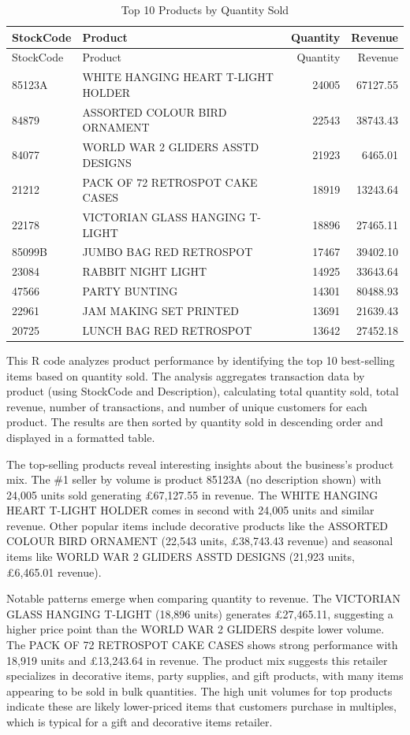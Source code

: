 \documentclass[
]{article}
\begin{document}
\begin{longtable}[]{@{}llrr@{}}
\caption{Top 10 Products by Quantity Sold}\tabularnewline
\toprule\noalign{}
StockCode & Product & Quantity & Revenue \\
\midrule\noalign{}
\endfirsthead
\toprule\noalign{}
StockCode & Product & Quantity & Revenue \\
\midrule\noalign{}
\endhead
\bottomrule\noalign{}
\endlastfoot
85123A & WHITE HANGING HEART T-LIGHT HOLDER & 24005 & 67127.55 \\
84879 & ASSORTED COLOUR BIRD ORNAMENT & 22543 & 38743.43 \\
84077 & WORLD WAR 2 GLIDERS ASSTD DESIGNS & 21923 & 6465.01 \\
21212 & PACK OF 72 RETROSPOT CAKE CASES & 18919 & 13243.64 \\
22178 & VICTORIAN GLASS HANGING T-LIGHT & 18896 & 27465.11 \\
85099B & JUMBO BAG RED RETROSPOT & 17467 & 39402.10 \\
23084 & RABBIT NIGHT LIGHT & 14925 & 33643.64 \\
47566 & PARTY BUNTING & 14301 & 80488.93 \\
22961 & JAM MAKING SET PRINTED & 13691 & 21639.43 \\
20725 & LUNCH BAG RED RETROSPOT & 13642 & 27452.18 \\
\end{longtable}

This R code analyzes product performance by identifying the top 10
best-selling items based on quantity sold. The analysis aggregates
transaction data by product (using StockCode and Description),
calculating total quantity sold, total revenue, number of transactions,
and number of unique customers for each product. The results are then
sorted by quantity sold in descending order and displayed in a formatted
table.

The top-selling products reveal interesting insights about the
business's product mix. The \#1 seller by volume is product 85123A (no
description shown) with 24,005 units sold generating £67,127.55 in
revenue. The WHITE HANGING HEART T-LIGHT HOLDER comes in second with
24,005 units and similar revenue. Other popular items include decorative
products like the ASSORTED COLOUR BIRD ORNAMENT (22,543 units,
£38,743.43 revenue) and seasonal items like WORLD WAR 2 GLIDERS ASSTD
DESIGNS (21,923 units, £6,465.01 revenue).

Notable patterns emerge when comparing quantity to revenue. The
VICTORIAN GLASS HANGING T-LIGHT (18,896 units) generates £27,465.11,
suggesting a higher price point than the WORLD WAR 2 GLIDERS despite
lower volume. The PACK OF 72 RETROSPOT CAKE CASES shows strong
performance with 18,919 units and £13,243.64 in revenue. The product mix
suggests this retailer specializes in decorative items, party supplies,
and gift products, with many items appearing to be sold in bulk
quantities. The high unit volumes for top products indicate these are
likely lower-priced items that customers purchase in multiples, which is
typical for a gift and decorative items retailer.\newpage
\end{document}
